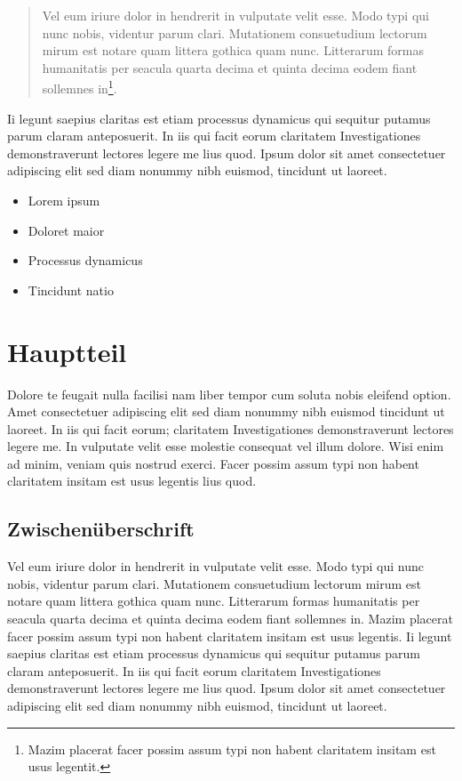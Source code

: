 \documentclass[a4paper,12pt]{scrartcl}
\begin{document}
\begin{quote}
Vel eum iriure dolor in hendrerit in vulputate velit esse. Modo typi qui nunc nobis, videntur parum clari. Mutationem consuetudium lectorum mirum est notare quam littera gothica quam nunc. Litterarum formas humanitatis per seacula quarta decima et quinta decima eodem fiant sollemnes in\footnote{Mazim placerat facer possim assum typi non habent claritatem insitam est usus legentit.}.
\end{quote}

 Ii legunt saepius claritas est etiam processus dynamicus qui sequitur putamus parum claram anteposuerit. In iis qui facit eorum claritatem Investigationes demonstraverunt lectores legere me lius quod. Ipsum dolor sit amet consectetuer adipiscing elit sed diam nonummy nibh euismod, tincidunt ut laoreet.
 
 
 \begin{itemize}
\item Lorem ipsum
\item Doloret maior
\item Processus dynamicus
\item Tincidunt natio

\end{itemize}



\section{Hauptteil}
Dolore te feugait nulla facilisi nam liber tempor cum soluta nobis eleifend option. Amet consectetuer adipiscing elit sed diam nonummy nibh euismod tincidunt ut laoreet. In iis qui facit eorum; claritatem Investigationes demonstraverunt lectores legere me. In vulputate velit esse molestie consequat vel illum dolore. Wisi enim ad minim, veniam quis nostrud exerci. Facer possim assum typi non habent claritatem insitam est usus legentis lius quod.

\subsection{Zwischenüberschrift}
Vel eum iriure dolor in hendrerit in vulputate velit esse. Modo typi qui nunc nobis, videntur parum clari. Mutationem consuetudium lectorum mirum est notare quam littera gothica quam nunc. Litterarum formas humanitatis per seacula quarta decima et quinta decima eodem fiant sollemnes in. Mazim placerat facer possim assum typi non habent claritatem insitam est usus legentis. Ii legunt saepius claritas est etiam processus dynamicus qui sequitur putamus parum claram anteposuerit. In iis qui facit eorum claritatem Investigationes demonstraverunt lectores legere me lius quod. Ipsum dolor sit amet consectetuer adipiscing elit sed diam nonummy nibh euismod, tincidunt ut laoreet.
\end{document}
